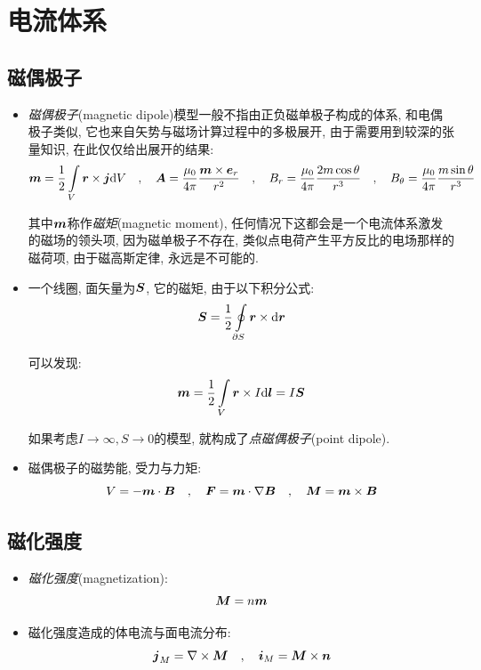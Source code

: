\section{电流体系}

\subsection{磁偶极子}

\begin{itemize}
\item \emph{磁偶极子}(magnetic dipole)模型一般不指由正负磁单极子构成的体系, 和电偶极子类似, 它也来自矢势与磁场计算过程中的多极展开, 由于需要用到较深的张量知识, 在此仅仅给出展开的结果:
\[\boldsymbol{m}=\frac{1}{2}\int\limits_V \boldsymbol{r}\times \boldsymbol{j}\textrm{d} V\quad ,\quad \boldsymbol{A}=\frac{\mu_0}{4\pi}\frac{\boldsymbol{m}\times \boldsymbol{e}_r}{r^2}\quad ,\quad B_r=\frac{\mu_0}{4\pi}\frac{2m\cos\theta }{r^3}\quad ,\quad B_\theta=\frac{\mu_0}{4\pi}\frac{m\sin\theta }{r^3}\]

其中$\boldsymbol{m}$称作\emph{磁矩}(magnetic moment), 任何情况下这都会是一个电流体系激发的磁场的领头项, 因为磁单极子不存在, 类似点电荷产生平方反比的电场那样的磁荷项, 由于磁高斯定律, 永远是不可能的.

\item 一个线圈, 面矢量为$\boldsymbol{S}$, 它的磁矩, 由于以下积分公式:
\[\boldsymbol{S}=\frac{1}{2}\oint\limits_{\partial S}\boldsymbol{r}\times \textrm{d} \boldsymbol{r}\]

可以发现:
\[\boldsymbol{m}=\frac{1}{2}\int\limits_V \boldsymbol{r}\times I \textrm{d} \boldsymbol{l}=I\boldsymbol{S}\]

如果考虑$I\to \infty, S\to 0$的模型, 就构成了\emph{点磁偶极子}(point dipole).

\item 磁偶极子的磁势能, 受力与力矩:
\[V=-\boldsymbol{m}\cdot \boldsymbol{B}\quad ,\quad \boldsymbol{F}=\boldsymbol{m}\cdot \nabla\boldsymbol{B}\quad ,\quad \boldsymbol{M}=\boldsymbol{m}\times \boldsymbol{B}\]

\end{itemize}

\subsection{磁化强度}

\begin{itemize}
\item \emph{磁化强度}(magnetization):
\[\boldsymbol{M}=n\boldsymbol{m}\]

\item 磁化强度造成的体电流与面电流分布:
\[\boldsymbol{j}_M=\nabla\times \boldsymbol{M}\quad ,\quad \boldsymbol{i}_M=\boldsymbol{M}\times \boldsymbol{n}\]


\end{itemize}


